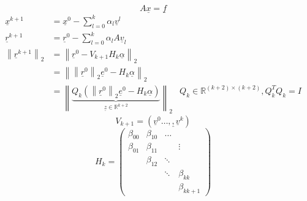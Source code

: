 \documentclass{article}
\newcommand{\norm}[1]{\left\|#1\right\|}
\begin{document}
\[ A\underline x  = \underline f \]
\begin{align*}
  \underline x^{k+1} &= \underline x^0 - \sum_{l=0}^k \alpha_l \underline v^l \\
  \underline r^{k+1} &= \underline r^0 - \sum_{l=0}^k \alpha_l A \underline v_l \\
  \norm{\underline r^{k+1}}_{2} &= \norm{\underline r^0 - V_{k+1} H_k \underline \alpha}_2 \\
    &= \norm{\norm{\underline r^0}_2 \underline e^0 - H_k \underline \alpha}_2 \\
    &= \norm{\underbrace{Q_k \left(\norm{\underline r^0}_2 \underline e^0 - H_k \underline\alpha\right)}_{\underline z \in \mathbb R^{k+2}}}_2 & Q_k \in \mathbb R^{(k+2)\times(k+2)}, Q_k^T Q_k = I
\end{align*}
\[ V_{k+1} = (\underline v^0 \ldots, \underline, \underline v^k) \]
\[
  H_k = \begin{pmatrix}
    \beta_{00} & \beta_{10} & \ldots & \\
    \beta_{01} & \beta_{11} &        & \vdots \\
               & \beta_{12} & \ddots & \\
               &            & \ddots & \beta_{kk} \\
               &            &        & \beta_{kk+1}
  \end{pmatrix}
\]
\end{document}
